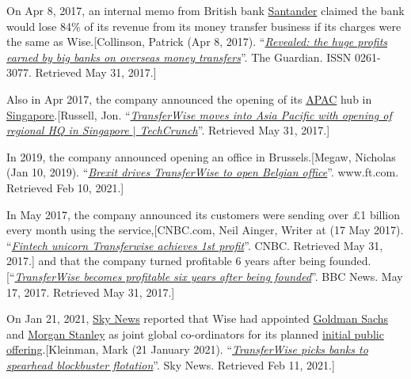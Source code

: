 \documentclass{book}
\numberwithin{equation}{section}
\begin{document}
%
On Apr 8, 2017, an internal memo from British bank \href{https://en.wikipedia.org/wiki/Santander_UK}{Santander} claimed the bank would lose 84\% of its revenue from its money transfer business if its charges were the same as Wise.[Collinson, Patrick (Apr 8, 2017). ``\href{https://www.theguardian.com/money/2017/apr/08/leaked-santander-international-money-transfers-transferwise}{\textit{Revealed: the huge profits earned by big banks on overseas money transfers}}''. The Guardian. ISSN 0261-3077. Retrieved May 31, 2017.]

%
Also in Apr 2017, the company announced the opening of its \href{https://en.wikipedia.org/wiki/Asia-Pacific}{APAC} hub in \href{https://en.wikipedia.org/wiki/Singapore}{Singapore}.[Russell, Jon. ``\href{https://techcrunch.com/2017/04/27/transferwise-asia-singapore-office/}{\textit{TransferWise moves into Asia Pacific with opening of regional HQ in Singapore $|$ TechCrunch}}''. Retrieved May 31, 2017.]

In 2019, the company announced opening an office in Brussels.[Megaw, Nicholas (Jan 10, 2019). ``\href{https://www.ft.com/content/bbe1487e-1438-11e9-a581-4ff78404524e}{\textit{Brexit drives TransferWise to open Belgian office}}''. www.ft.com. Retrieved Feb 10, 2021.]

%
In May 2017, the company announced its customers were sending over £1 billion every month using the service,[CNBC.com, Neil Ainger, Writer at (17 May 2017). ``\href{https://www.cnbc.com/2017/05/17/fintech-unicorn-transferwise-achieves-first-profit.html}{\textit{Fintech unicorn Transferwise achieves 1st profit}}''. CNBC. Retrieved May 31, 2017.] and that the company turned profitable 6 years after being founded.[``\href{https://www.bbc.co.uk/news/business-39943651}{\textit{TransferWise becomes profitable six years after being founded}}''. BBC News. May 17, 2017. Retrieved May 31, 2017.]

%
On Jan 21, 2021, \href{https://en.wikipedia.org/wiki/Sky_News}{Sky News} reported that Wise had appointed \href{https://en.wikipedia.org/wiki/Goldman_Sachs}{Goldman Sachs} and \href{https://en.wikipedia.org/wiki/Morgan_Stanley}{Morgan Stanley} as joint global co-ordinators for its planned \href{https://en.wikipedia.org/wiki/Initial_public_offering}{initial public offering}.[Kleinman, Mark (21 January 2021). ``\href{https://news.sky.com/story/transferwise-picks-banks-to-spearhead-blockbuster-flotation-12194386}{\textit{TransferWise picks banks to spearhead blockbuster flotation}}''. Sky News. Retrieved Feb 11, 2021.]
\end{document}
